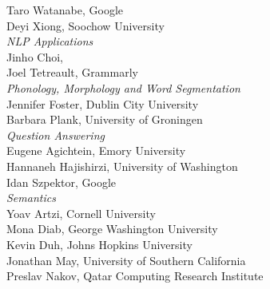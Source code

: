                                     \hspace*{0.2in} Taro Watanabe, Google \\
                                    \hspace*{0.2in} Deyi Xiong, Soochow University \\
                            \emph{NLP Applications} \\
                                    \hspace*{0.2in} Jinho Choi,  \\
                                    \hspace*{0.2in} Joel Tetreault, Grammarly \\
                            \emph{Phonology, Morphology and Word Segmentation} \\
                                    \hspace*{0.2in} Jennifer Foster, Dublin City University \\
                                    \hspace*{0.2in} Barbara Plank, University of Groningen \\
                            \emph{Question Answering} \\
                                    \hspace*{0.2in} Eugene Agichtein, Emory University \\
                                    \hspace*{0.2in} Hannaneh Hajishirzi, University of Washington \\
                                    \hspace*{0.2in} Idan Szpektor, Google \\\pagebreak
                            \emph{Semantics} \\
                                    \hspace*{0.2in} Yoav Artzi, Cornell University \\
                                    \hspace*{0.2in} Mona Diab, George Washington University \\
                                    \hspace*{0.2in} Kevin Duh, Johns Hopkins University \\
                                    \hspace*{0.2in} Jonathan May, University of Southern California \\
                                    \hspace*{0.2in} Preslav Nakov, Qatar Computing Research Institute \\

